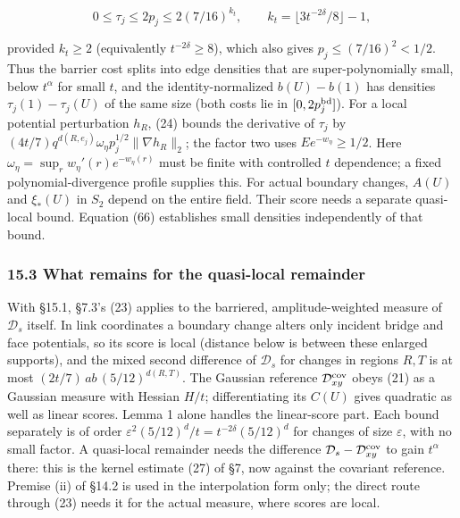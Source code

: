 \documentclass[11pt,a4paper]{article}
\begin{document}
\[0\le\tau_j\le2p_j\le2(7/16)^{k_t},\qquad
k_t=\lfloor3t^{-2\delta}/8\rfloor-1,\tag{67}\]

provided \(k_t\ge2\) (equivalently \(t^{-2\delta}\ge8\)), which also
gives \(p_j\le(7/16)^2<1/2\). Thus the barrier cost splits into edge
densities that are super-polynomially small, below \(t^\alpha\) for
small \(t\), and the identity-normalized \(b(U)-b(1)\) has densities
\(\tau_j(1)-\tau_j(U)\) of the same size (both costs lie in
\([0,2p_j^{\rm bd}]\)). For a local potential perturbation \(h_R\), (24)
bounds the derivative of \(\tau_j\) by
\((4t/7)q^{d(R,e_j)}\omega_\eta p_j^{1/2}\|\nabla h_R\|_2\); the factor
two uses \(E e^{-w_\eta}\ge1/2\). Here
\(\omega_\eta=\sup_r w_\eta'(r)e^{-w_\eta(r)}\) must be finite with
controlled \(t\) dependence; a fixed polynomial-divergence profile
supplies this. For actual boundary changes, \(A(U)\) and \(\xi_*(U)\) in
\(S_2\) depend on the entire field. Their score needs a separate
quasi-local bound. Equation (66) establishes small densities
independently of that bound.

\hypertarget{what-remains-for-the-quasi-local-remainder}{%
\subsubsection{15.3 What remains for the quasi-local
remainder}\label{what-remains-for-the-quasi-local-remainder}}

With §15.1, §7.3's (23) applies to the barriered, amplitude-weighted
measure of \(\mathcal D_s\) itself. In link coordinates a boundary
change alters only incident bridge and face potentials, so its score is
local (distance below is between these enlarged supports), and the mixed
second difference of \(\mathcal D_s\) for changes in regions \(R,T\) is
at most \((2t/7)\,ab\,(5/12)^{d(R,T)}\). The Gaussian reference
\(\mathcal D^{\rm cov}_{xy}\) obeys (21) as a Gaussian measure with
Hessian \(H/t\); differentiating its \(C(U)\) gives quadratic as well as
linear scores. Lemma 1 alone handles the linear-score part. Each bound
separately is of order \(\varepsilon^2(5/12)^d/t=t^{-2\delta}(5/12)^d\)
for changes of size \(\varepsilon\), with no small factor. A quasi-local
remainder needs the difference
\(\mathcal D_s-\mathcal D^{\rm cov}_{xy}\) to gain \(t^\alpha\) there:
this is the kernel estimate (27) of §7, now against the covariant
reference. Premise (ii) of §14.2 is used in the interpolation form only;
the direct route through (23) needs it for the actual measure, where
scores are local.
\end{document}
